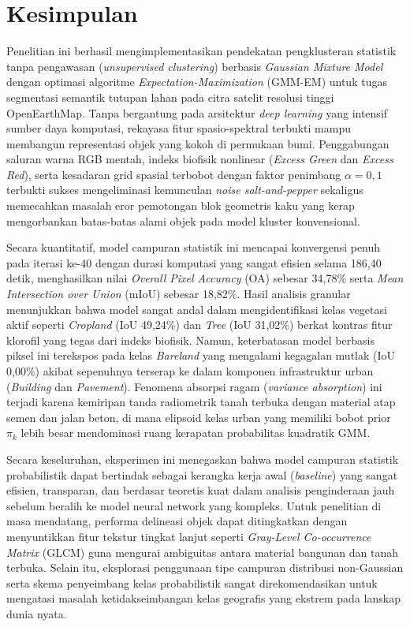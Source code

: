 \documentclass[11pt,twoside]{article}
\begin{document}
\section{Kesimpulan}
\label{Sec:Conclusion}

Penelitian ini berhasil mengimplementasikan pendekatan pengklusteran statistik tanpa pengawasan (\textit{unsupervised clustering}) berbasis \textit{Gaussian Mixture Model} dengan optimasi algoritme \textit{Expectation-Maximization} (GMM-EM) untuk tugas segmentasi semantik tutupan lahan pada citra satelit resolusi tinggi OpenEarthMap. Tanpa bergantung pada arsitektur \textit{deep learning} yang intensif sumber daya komputasi, rekayasa fitur spasio-spektral terbukti mampu membangun representasi objek yang kokoh di permukaan bumi. Penggabungan saluran warna RGB mentah, indeks biofisik nonlinear (\textit{Excess Green} dan \textit{Excess Red}), serta kesadaran grid spasial terbobot dengan faktor penimbang $\alpha = 0,1$ terbukti sukses mengeliminasi kemunculan \textit{noise salt-and-pepper} sekaligus memecahkan masalah eror pemotongan blok geometris kaku yang kerap mengorbankan batas-batas alami objek pada model kluster konvensional.

Secara kuantitatif, model campuran statistik ini mencapai konvergensi penuh pada iterasi ke-40 dengan durasi komputasi yang sangat efisien selama 186,40 detik, menghasilkan nilai \textit{Overall Pixel Accuracy} (OA) sebesar 34,78\% serta \textit{Mean Intersection over Union} (mIoU) sebesar 18,82\%. Hasil analisis granular menunjukkan bahwa model sangat andal dalam mengidentifikasi kelas vegetasi aktif seperti \textit{Cropland} (IoU 49,24\%) dan \textit{Tree} (IoU 31,02\%) berkat kontras fitur klorofil yang tegas dari indeks biofisik. Namun, keterbatasan model berbasis piksel ini terekspos pada kelas \textit{Bareland} yang mengalami kegagalan mutlak (IoU 0,00\%) akibat sepenuhnya terserap ke dalam komponen infrastruktur urban (\textit{Building} dan \textit{Pavement}). Fenomena absorpsi ragam (\textit{variance absorption}) ini terjadi karena kemiripan tanda radiometrik tanah terbuka dengan material atap semen dan jalan beton, di mana elipsoid kelas urban yang memiliki bobot prior $\pi_k$ lebih besar mendominasi ruang kerapatan probabilitas kuadratik GMM.

Secara keseluruhan, eksperimen ini menegaskan bahwa model campuran statistik probabilistik dapat bertindak sebagai kerangka kerja awal (\textit{baseline}) yang sangat efisien, transparan, dan berdasar teoretis kuat dalam analisis penginderaan jauh sebelum beralih ke model neural network yang kompleks. Untuk penelitian di masa mendatang, performa delineasi objek dapat ditingkatkan dengan menyuntikkan fitur tekstur tingkat lanjut seperti \textit{Gray-Level Co-occurrence Matrix} (GLCM) guna mengurai ambiguitas antara material bangunan dan tanah terbuka. Selain itu, eksplorasi penggunaan tipe campuran distribusi non-Gaussian serta skema penyeimbang kelas probabilistik sangat direkomendasikan untuk mengatasi masalah ketidakseimbangan kelas geografis yang ekstrem pada lanskap dunia nyata.

\printbibliography
\end{document}
